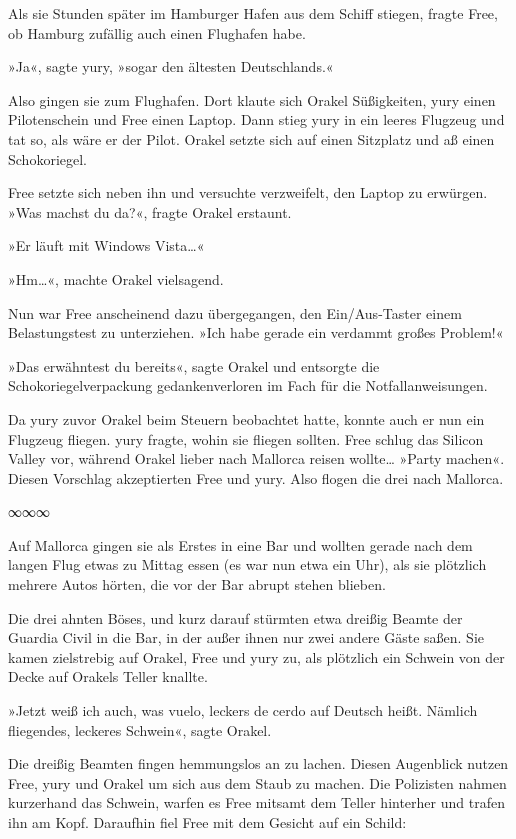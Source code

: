 Als sie Stunden später im Hamburger Hafen aus dem Schiff stiegen, fragte Free, ob Hamburg zufällig auch einen Flughafen habe.

»Ja«, sagte yury, »sogar den ältesten Deutschlands.«

Also gingen sie zum Flughafen. Dort klaute sich Orakel Süßigkeiten, yury einen Pilotenschein und Free einen Laptop. Dann stieg yury in ein leeres Flugzeug und tat so, als wäre er der Pilot. Orakel setzte sich auf einen Sitzplatz und aß einen Schokoriegel.

Free setzte sich neben ihn und versuchte verzweifelt, den Laptop zu erwürgen. »Was machst du da?«, fragte Orakel erstaunt.

»Er läuft mit Windows Vista…«

»Hm…«, machte Orakel vielsagend.

Nun war Free anscheinend dazu übergegangen, den Ein/Aus-Taster einem Belastungstest zu unterziehen. »Ich habe gerade ein verdammt großes Problem!«

»Das erwähntest du bereits«, sagte Orakel und entsorgte die Schokoriegelverpackung gedankenverloren im Fach für die Notfallanweisungen.

Da yury zuvor Orakel beim Steuern beobachtet hatte, konnte auch er nun ein Flugzeug fliegen. yury fragte, wohin sie fliegen sollten. Free schlug das Silicon Valley vor, während Orakel lieber nach Mallorca reisen wollte… »Party machen«. Diesen Vorschlag akzeptierten Free und yury. Also flogen die drei nach Mallorca.

\begin{center}
    ∞∞∞
\end{center}

Auf Mallorca gingen sie als Erstes in eine Bar und wollten gerade nach dem langen Flug etwas zu Mittag essen (es war nun etwa ein Uhr), als sie plötzlich mehrere Autos hörten, die vor der Bar abrupt stehen blieben.

Die drei ahnten Böses, und kurz darauf stürmten etwa dreißig Beamte der Guardia Civil in die Bar, in der außer ihnen nur zwei andere Gäste saßen. Sie kamen zielstrebig auf Orakel, Free und yury zu, als plötzlich ein Schwein von der Decke auf Orakels Teller knallte.

»Jetzt weiß ich auch, was vuelo, leckers de cerdo auf Deutsch heißt. Nämlich fliegendes, leckeres Schwein«, sagte Orakel.

Die dreißig Beamten fingen hemmungslos an zu lachen. Diesen Augenblick nutzen Free, yury und Orakel um sich aus dem Staub zu machen. Die Polizisten nahmen kurzerhand das Schwein, warfen es Free mitsamt dem Teller hinterher und trafen ihn am Kopf. Daraufhin fiel Free mit dem Gesicht auf ein Schild:


